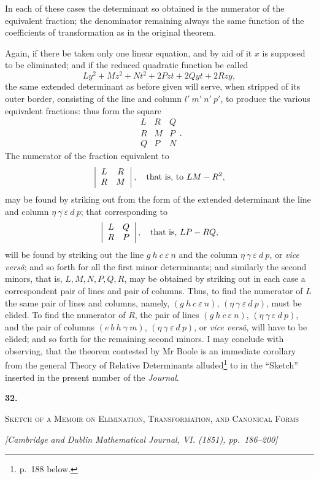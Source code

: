 \documentclass[11pt]{article}
\newcommand{\paperhead}[3]{%
  \clearpage
  \begin{center}
  {\Large\bfseries #1.}\par\vspace{0.85em}
  {\large\scshape #2}\par\vspace{0.6em}
  {\itshape [#3]}\par
  \end{center}\vspace{0.4em}}
\begin{document}
{{In each of these cases the determinant so obtained is the numerator of the equivalent fraction; the denominator remaining always the same function of the coefficients of transformation as in the original theorem.

Again, if there be taken only one linear equation, and by aid of it $x$ is supposed to be eliminated; and if the reduced quadratic function be called
\[
 Ly^2+Mz^2+Nt^2+2Pzt+2Qyt+2Rzy,
\]
the same extended determinant as before given will serve, when stripped of its outer border, consisting of the line and column $l'\ m'\ n'\ p'$, to produce the various equivalent fractions: thus form the square
\[
\begin{array}{ccc}
L&R&Q\\
R&M&P\\
Q&P&N
\end{array}.
\]
The numerator of the fraction equivalent to
\[
\left|\begin{array}{cc}L&R\\ R&M\end{array}\right|,
\quad\hbox{that is, to }LM-R^2,
\]
may be found by striking out from the form of the extended determinant the line and column $\eta\ \gamma\ \varepsilon\ d\ p$; that corresponding to
\[
\left|\begin{array}{cc}L&Q\\ R&P\end{array}\right|,
\quad\hbox{that is, }LP-RQ,
\]
will be found by striking out the line $g\ h\ c\ \varepsilon\ n$ and the column $\eta\ \gamma\ \varepsilon\ d\ p$, or \emph{vice vers\^a}; and so forth for all the first minor determinants; and similarly the second minors, that is, $L,M,N,P,Q,R$, may be obtained by striking out in each case a correspondent pair of lines and pair of columns. Thus, to find the numerator of $L$ the same pair of lines and columns, namely, $(g\ h\ c\ \varepsilon\ n)$, $(\eta\ \gamma\ \varepsilon\ d\ p)$, must be elided. To find the numerator of $R$, the pair of lines $(g\ h\ c\ \varepsilon\ n)$, $(\eta\ \gamma\ \varepsilon\ d\ p)$, and the pair of columns $(e\ b\ h\ \gamma\ m)$, $(\eta\ \gamma\ \varepsilon\ d\ p)$, or \emph{vice vers\^a}, will have to be elided; and so forth for the remaining second minors. I may conclude with observing, that the theorem contested by Mr Boole is an immediate corollary from the general Theory of Relative Determinants alluded\footnote{p.~188 below.} to in the ``Sketch'' inserted in the present number of the \emph{Journal}.

\paperhead{32}{Sketch of a Memoir on Elimination, Transformation, and Canonical Forms}{Cambridge and Dublin Mathematical Journal, VI. (1851), pp.~186--200}

}}
\end{document}
